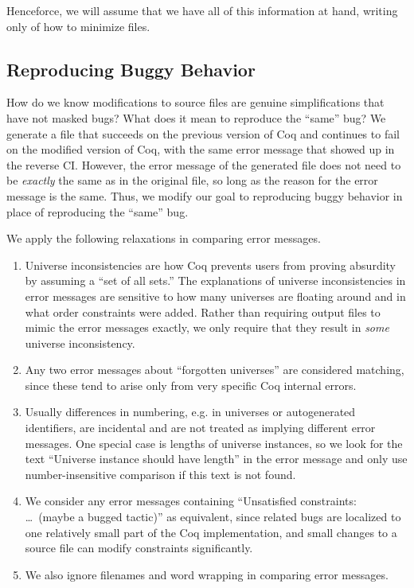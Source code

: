 \documentclass[a4paper,USenglish,cleveref,autoref,thm-restate]{lipics-v2021}
\begin{document}
Henceforce, we will assume that we have all of this information at hand, writing only of how to minimize files.

\subsection{Reproducing Buggy Behavior}\label{sec:error-messages}

How do we know modifications to source files are genuine simplifications that have not masked bugs?
What does it mean to reproduce the ``same'' bug?
We generate a file that succeeds on the previous version of Coq and continues to fail on the modified version of Coq, with the same error message that showed up in the reverse CI.
However, the error message of the generated file does not need to be \emph{exactly} the same as in the original file, so long as the reason for the error message is the same.
Thus, we modify our goal to reproducing buggy behavior in place of reproducing the ``same'' bug.

We apply the following relaxations in comparing error messages.
\begin{enumerate}

\item Universe inconsistencies are how Coq prevents users from proving absurdity by assuming a ``set of all sets.''
The explanations of universe inconsistencies in error messages are sensitive to how many universes are floating around and in what order constraints were added.
Rather than requiring output files to mimic the error messages exactly, we only require that they result in \emph{some} universe inconsistency.

\item Any two error messages about ``forgotten universes'' are considered matching, since these tend to arise only from very specific Coq internal errors.

\item Usually differences in numbering, e.g. in universes or autogenerated identifiers, are incidental and are not treated as implying different error messages.  One special case is lengths of universe instances, so we look for the text ``Universe instance should have length'' in the error message and only use number-insensitive comparison if this text is not found.

\item We consider any error messages containing ``Unsatisfied constraints: \ldots\ (maybe a bugged tactic)'' as equivalent, since related bugs are localized to one relatively small part of the Coq implementation, and small changes to a source file can modify constraints significantly.

\item We also ignore filenames and word wrapping in comparing error messages.

\end{enumerate}
\end{document}
